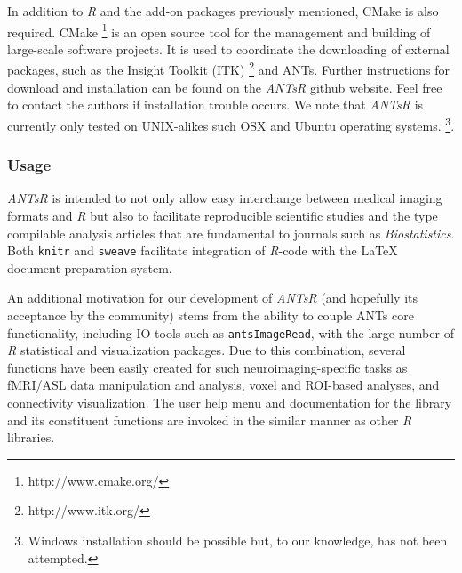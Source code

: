 \documentclass[final,5p,times,twocolumn]{elsarticle}
\begin{document}
In addition to \textit{R} and the add-on packages previously mentioned, CMake is also 
required.  CMake%
\footnote{
http://www.cmake.org/
}
is an open source tool for the management and building of 
large-scale software projects.  It is used
to coordinate the downloading of external packages,
such as the Insight Toolkit (ITK)%
\footnote{
http://www.itk.org/
}
and ANTs.  Further instructions for download and
installation can be found on the \textit{ANTsR} github website.  Feel
free to contact the authors if installation trouble occurs.  We note
that \textit{ANTsR} is currently only tested on UNIX-alikes such OSX and Ubuntu
operating systems.  \footnote{Windows installation should be possible
  but, to our knowledge, has not been attempted.}.

\subsubsection{Usage}
\textit{ANTsR} is intended to not only allow easy interchange between
medical imaging formats and \textit{R} but also to facilitate
reproducible scientific studies and the type compilable analysis
articles that are fundamental to journals such as
\textit{Biostatistics}.  Both \verb#knitr# and \verb#sweave#
facilitate integration of \textit{R}-code with the LaTeX document
preparation system.  

An additional motivation for our development of \textit{ANTsR} (and
hopefully its acceptance by the community) 
stems from the ability to couple ANTs core 
functionality, including IO tools such as \verb#antsImageRead#, 
with the large number of \textit{R} statistical and
visualization packages.  Due to this combination, several
functions have been easily created for such neuroimaging-specific 
tasks as fMRI/ASL data manipulation and analysis,
voxel and ROI-based  analyses,
and connectivity visualization. %
The user help menu and documentation for the library  and its
constituent functions are invoked in the similar manner as other
\textit{R} libraries.
\end{document}
